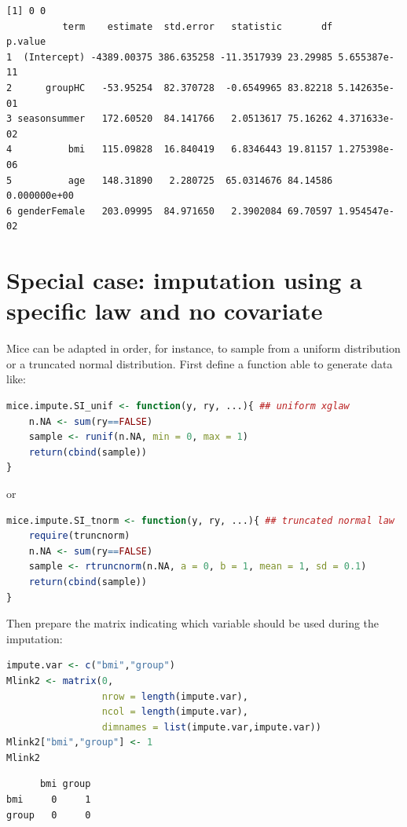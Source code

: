 \documentclass[12pt]{article}
\begin{document}
\label{}
\begin{verbatim}
[1] 0 0
          term    estimate  std.error   statistic       df      p.value
1  (Intercept) -4389.00375 386.635258 -11.3517939 23.29985 5.655387e-11
2      groupHC   -53.95254  82.370728  -0.6549965 83.82218 5.142635e-01
3 seasonsummer   172.60520  84.141766   2.0513617 75.16262 4.371633e-02
4          bmi   115.09828  16.840419   6.8346443 19.81157 1.275398e-06
5          age   148.31890   2.280725  65.0314676 84.14586 0.000000e+00
6 genderFemale   203.09995  84.971650   2.3902084 69.70597 1.954547e-02
\end{verbatim}


\clearpage
\section{Special case: imputation using a specific law and no covariate}
\label{sec:orgae21c12}
Mice can be adapted in order, for instance, to sample from a uniform
distribution or a truncated normal distribution. First define a
function able to generate data like:
\begin{lstlisting}[language=r,numbers=none]
mice.impute.SI_unif <- function(y, ry, ...){ ## uniform xglaw
    n.NA <- sum(ry==FALSE)
    sample <- runif(n.NA, min = 0, max = 1)
    return(cbind(sample))
}
\end{lstlisting}

or

\begin{lstlisting}[language=r,numbers=none]
mice.impute.SI_tnorm <- function(y, ry, ...){ ## truncated normal law
    require(truncnorm)
    n.NA <- sum(ry==FALSE)
    sample <- rtruncnorm(n.NA, a = 0, b = 1, mean = 1, sd = 0.1)
    return(cbind(sample))
}
\end{lstlisting}
Then prepare the matrix indicating which variable should be used
during the imputation:
\begin{lstlisting}[language=r,numbers=none]
impute.var <- c("bmi","group")
Mlink2 <- matrix(0, 
                 nrow = length(impute.var), 
                 ncol = length(impute.var), 
                 dimnames = list(impute.var,impute.var))
Mlink2["bmi","group"] <- 1
Mlink2
\end{lstlisting}

\label{}
\begin{verbatim}
      bmi group
bmi     0     1
group   0     0
\end{verbatim}


\clearpage 
\end{document}
